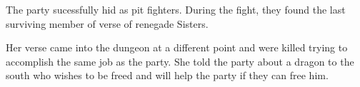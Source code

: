 The party sucessfully hid as pit fighters.
During the fight, they found the last surviving member of verse of renegade Sisters.

Her verse came into the dungeon at a different point and were killed trying to accomplish the same job as the party.
She told the party about a dragon to the south who wishes to be freed and will help the party if they can free him.

